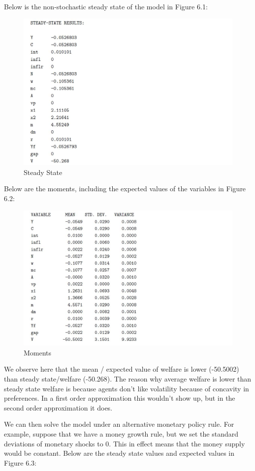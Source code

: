 \documentclass[cn,10pt,math=newtx,citestyle=gb7714-2015,bibstyle=gb7714-2015]{elegantbook}
\begin{document}
	Below is the non-stochastic steady state of the model in Figure 6.1:
	
	\begin{figure}[htbp!]
		\centering
		\includegraphics[width=0.8\linewidth]{FIG/SS}
		\caption{Steady State}\label{6.1}
		\centering
	\end{figure}
	
	Below are the moments, including the expected values of the variables in Figure 6.2:
	\begin{figure}[htbp!]
		\centering
		\includegraphics[width=0.8\linewidth]{FIG/moment}
		\caption{Moments}\label{6.2}
		\centering
	\end{figure}
	
	We observe here that the mean / expected value of welfare is lower (-50.5002) than steady state/welfare (-50.268). The reason why average welfare is lower than steady state welfare is because agents don't like volatility because of concavity in preferences. In a first order approximation this wouldn't show up, but in the second order approximation it does.
	
	We can then solve the model under an alternative monetary policy rule. For example, suppose that we have a money growth rule, but we set the standard deviations of monetary shocks to 0. This in effect means that the money supply would be constant. Below are the steady state values and expected values in Figure 6.3:
	
\end{document}
